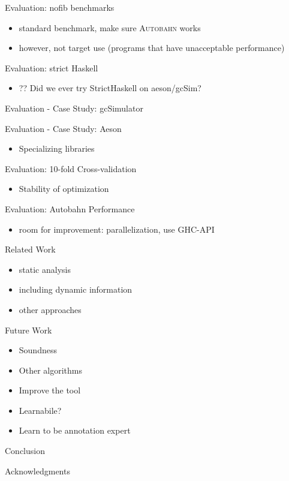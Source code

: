 \documentclass{beamer}
\newcommand{\tname}{\textsc{Autobahn}}
\begin{document}
\begin{frame}{Evaluation: nofib benchmarks}
  \begin{itemize}
  \item standard benchmark, make sure \tname{} works
  \item however, not target use (programs that have unacceptable performance)
  \end{itemize}
\end{frame}

\begin{frame}{Evaluation: strict Haskell}
  \begin{itemize}
  \item ?? Did we ever try StrictHaskell on aeson/gcSim?
  \end{itemize}
\end{frame}

\begin{frame}{Evaluation - Case Study: gcSimulator}
\end{frame}

\begin{frame}{Evaluation - Case Study: Aeson}
  \begin{itemize}
  \item Specializing libraries
  \end{itemize}
\end{frame}

\begin{frame}{Evaluation: 10-fold Cross-validation}
  \begin{itemize}
  \item Stability of optimization
  \end{itemize}
\end{frame}

\begin{frame}{Evaluation: Autobahn Performance}
  \begin{itemize}
  \item room for improvement: parallelization, use GHC-API
  \end{itemize}
\end{frame}

\begin{frame}{Related Work}
  \begin{itemize}
  \item static analysis
  \item including dynamic information
  \item other approaches
  \end{itemize}
\end{frame}

\begin{frame}{Future Work}
  \begin{itemize}
  \item Soundness
  \item Other algorithms
  \item Improve the tool
  \item Learnabile?
  \item Learn to be annotation expert
  \end{itemize}
\end{frame}

\begin{frame}{Conclusion}
\end{frame}

\begin{frame}{Acknowledgments}
\end{frame}
\end{document}
